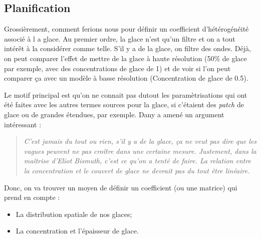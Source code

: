 \documentclass[10pt]{article}
\numberwithin{equation}{section}
\begin{document}
\subsection{Planification}
\label{sec:org8cc02ab}
Grossièrement, comment ferions nous pour définir un coefficient d'hétérogénéité associé à l a glace.
Au premier ordre, la glace n'est qu'un filtre et on a tout intérêt à la considérer comme telle.
S'il y a de la glace, on filtre des ondes.
Déjà, on peut comparer l'effet de mettre de la glace à haute résolution (50\% de glace par exemple, avec des concentrations de glace de 1) et de voir si l'on peut comparer ça avec un modèle à basse résolution (Concentration de glace de 0.5). \bigskip

Le motif principal est qu'on ne connait pas dutout les paramètrisations qui ont été faites avec les autres termes sources pour la glace, si c'étaient des \emph{patch} de glace ou de grandes étendues, par exemple.
Dany a amené un argument intéressant :\smallskip
\begin{quote}
\emph{C'est jamais du tout ou rien, s'il y a de la glace, ça ne veut pas dire que les vagues peuvent ne pas croître dans une certaine mesure. Justement, dans la maîtrise d'Eliot Bismuth, c'est ce qu'on a tenté de faire. La relation entre la concentration et le couvert de glace ne devrait pas du tout être linéaire.}
\end{quote}
Donc, on va trouver un moyen de définir un coefficient (ou une matrice) qui prend en compte :
\begin{itemize}
\item La distribution spatiale de nos glaces;
\item La concentration et l'épaisseur de glace.
\end{itemize}
\end{document}
